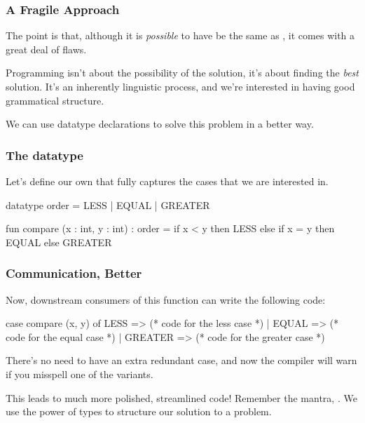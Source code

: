 \documentclass[aspectratio=169, handout]{beamer}
\begin{document}
\begin{frame}[fragile]
  \frametitle{A Fragile Approach}

  The point is that, although it is \textit{possible} to have  be the
  same as , it comes with a great deal of flaws.

  \pause
  \vspace{\fill}

  Programming isn't about the possibility of the solution, it's about finding the
  \textit{best} solution. It's an inherently linguistic process, and we're interested
  in having good grammatical structure.

  \pause
  \vspace{\fill}

  We can use datatype declarations to solve this problem in a better way.
\end{frame}

\begin{frame}[fragile]
  \frametitle{The  datatype}

  Let's define our own  that fully captures the cases that
  we are interested in.

  \pause
  \vspace{\fill}

  \begin{codeblock}
    datatype order = LESS | EQUAL | GREATER

    fun compare (x : int, y : int) : order =
      if x < y then
        LESS
      else if x = y then
        EQUAL
      else
        GREATER
  \end{codeblock}
\end{frame}

\begin{frame}[fragile]
  \frametitle{Communication, Better}

  \tgs

  Now, downstream consumers of this function can write the following code:

  \pause
  \vspace{\fill}

  \begin{codeblock}
    case compare (x, y) of
      LESS => (* code for the less case *)
    | EQUAL => (* code for the equal case *)
    | GREATER => (* code for the greater case *)
  \end{codeblock}

  \pause
  \vspace{\fill}

  There's no need to have an extra redundant case, and now the compiler will
  warn if you misspell one of the variants.

  \pause
  \vspace{\fill}

  This leads to much more polished, streamlined code! Remember the mantra,
  . We use the power of types to structure our
  solution to a problem.
\end{frame}
\end{document}
